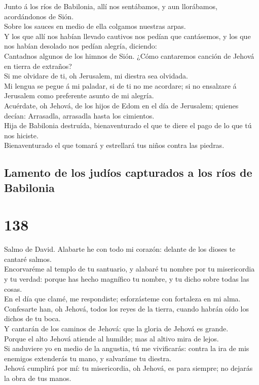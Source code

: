  Junto á los ríos de Babilonia, allí nos sentábamos, y aun
llorábamos, acordándonos de Sión.\\
 Sobre los sauces en medio de ella colgamos nuestras
arpas.\\
 Y los que allí nos habían llevado cautivos nos pedían que
cantásemos, y los que nos habían desolado nos pedían alegría,
diciendo:\\
 Cantadnos algunos de los himnos de Sión. ¿Cómo cantaremos
canción de Jehová en tierra de extraños?\\
 Si me olvidare de ti, oh Jerusalem, mi diestra sea
olvidada.\\
 Mi lengua se pegue á mi paladar, si de ti no me acordare;
si no ensalzare á Jerusalem como preferente asunto de mi alegría.\\
 Acuérdate, oh Jehová, de los hijos de Edom en el día de
Jerusalem; quienes decían: Arrasadla, arrasadla hasta los cimientos.\\
 Hija de Babilonia destruída, bienaventurado el que te
diere el pago de lo que tú nos hiciste.\\
 Bienaventurado el que tomará y estrellará tus niños
contra las piedras.

\hypertarget{lamento-de-los-juduxedos-capturados-a-los-ruxedos-de-babilonia-1}{%
\subsection{Lamento de los judíos capturados a los ríos de
Babilonia}\label{lamento-de-los-juduxedos-capturados-a-los-ruxedos-de-babilonia-1}}

\hypertarget{section-19-138}{%
\section{138}\label{section-19-138}}

 Salmo de David. Alabarte he con todo mi corazón: delante
de los dioses te cantaré salmos.\\
 Encorvaréme al templo de tu santuario, y alabaré tu
nombre por tu misericordia y tu verdad: porque has hecho magnífico tu
nombre, y tu dicho sobre todas las cosas.\\
 En el día que clamé, me respondiste; esforzásteme con
fortaleza en mi alma.\\
 Confesarte han, oh Jehová, todos los reyes de la tierra,
cuando habrán oído los dichos de tu boca.\\
 Y cantarán de los caminos de Jehová: que la gloria de
Jehová es grande.\\
 Porque el alto Jehová atiende al humilde; mas al altivo
mira de lejos.\\
 Si anduviere yo en medio de la angustia, tú me
vivificarás: contra la ira de mis enemigos extenderás tu mano, y
salvaráme tu diestra.\\
 Jehová cumplirá por mí: tu misericordia, oh Jehová, es
para siempre; no dejarás la obra de tus manos.

